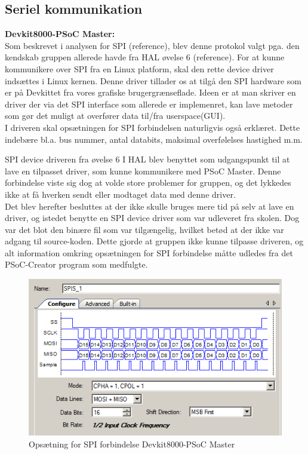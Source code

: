 \subsection{Seriel kommunikation}

\textbf{Devkit8000-PSoC Master:} \\

Som beskrevet i analysen for SPI (reference), blev denne protokol valgt pga. den kendskab gruppen allerede havde fra HAL øvelse 6 (reference). 
For at kunne kommunikere over SPI fra en Linux platform, skal den rette device driver indsættes i Linux kernen. Denne driver tillader os at tilgå
den SPI hardware som er på Devkittet fra vores grafiske brugergrænseflade. Ideen er at man skriver en driver der via det SPI interface som allerede er 
implemenret, kan lave metoder som gør det muligt at overfører data til/fra userspace(GUI).\\

I driveren skal opsætningen for SPI forbindelsen naturligvis også erklæret. Dette indebære bl.a. bus nummer, antal databits, maksimal overfølelses hastighed m.m.  
 
SPI device driveren fra øvelse 6 I HAL blev benyttet som udgangspunkt til at lave en tilpasset driver, som kunne kommunikere med PSoC Master. 
Denne forbindelse viste sig dog at volde store problemer for gruppen, og det lykkedes ikke at få hverken sendt eller modtaget data med denne driver.\\

Det blev herefter besluttes at der ikke skulle bruges mere tid på selv at lave en driver, og istedet benytte en SPI device driver som var udleveret fra skolen.
Dog var det blot den binære fil som var tilgængelig, hvilket betød at der ikke var adgang til source-koden. Dette gjorde at gruppen ikke kunne tilpasse driveren,
og alt information omkring opsætningen for SPI forbindelse måtte udledes fra det PSoC-Creator program som medfulgte. 

\begin{figure}[H]
\includegraphics[scale=0.6]{tex/Design/SPI/Clock_mode_SPI}
\caption{Opsætning for SPI forbindelse Devkit8000-PSoC Master}
\end{figure}

